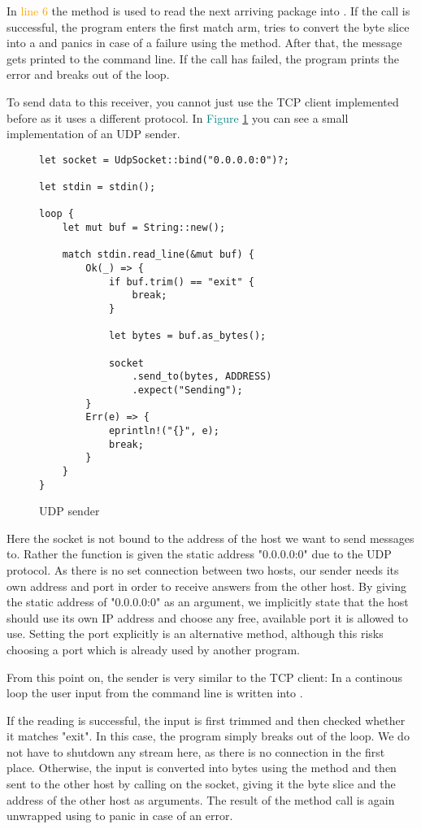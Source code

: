 In \textcolor{orange}{line 6} the method  is used to read the next arriving package into . If
the call is successful, the program enters the first match arm, tries to convert the byte slice into a  and
panics in case of a failure using the  method. After that, the message gets printed to the command line.
If the call has failed, the program prints the error and breaks out of the loop.

To send data to this receiver, you cannot just use the TCP client implemented before as it uses a different protocol. In
\textcolor{teal}{Figure \ref{udp-sender}} you can see a small implementation of an UDP sender.

\begin{figure}[ht]
    \begin{verbatim}
let socket = UdpSocket::bind("0.0.0.0:0")?;

let stdin = stdin();

loop {
    let mut buf = String::new();

    match stdin.read_line(&mut buf) {
        Ok(_) => {
            if buf.trim() == "exit" {
                break;
            }

            let bytes = buf.as_bytes();

            socket
                .send_to(bytes, ADDRESS)
                .expect("Sending");
        }
        Err(e) => {
            eprintln!("{}", e);
            break;
        }
    }
}
    \end{verbatim}
    \caption{UDP sender}
    \label{udp-sender}
\end{figure}

Here the socket is not bound to the address of the host we want to send messages to. Rather the  function is
given the static address "0.0.0.0:0" due to the UDP protocol. As there is no set connection between two hosts, our
sender needs its own address and port in order to receive answers from the other host. By giving  the static
address of "0.0.0.0:0" as an argument, we implicitly state that the host should use its own IP address and choose any
free, available port it is allowed to use. Setting the port explicitly is an alternative method, although this risks
choosing a port which is already used by another program.

From this point on, the sender is very similar to the TCP client: In a continous loop the user input from the command
line is written into .

If the reading is successful, the input is first trimmed and then checked whether it matches "exit". In this case, the
program simply breaks out of the loop. We do not have to shutdown any stream here, as there is no connection in the
first place. Otherwise, the input is converted into bytes using the method  and then sent to the other
host by calling  on the socket, giving it the byte slice and the address of the other host as arguments.
The result of the method call is again unwrapped using  to panic in case of an error.
